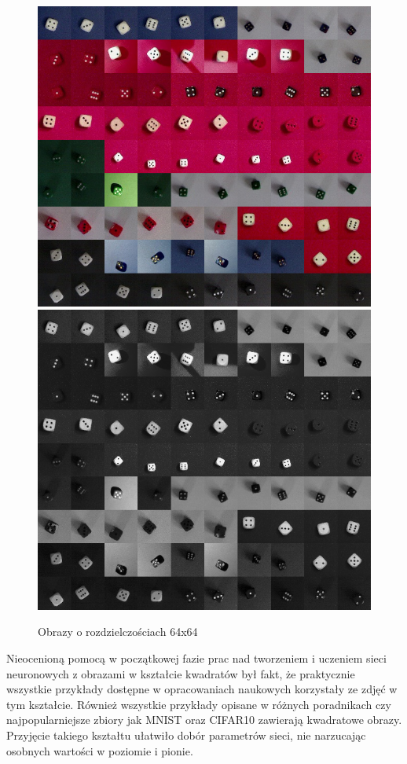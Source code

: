 \begin{figure}[h]
\centering
\includegraphics[scale=0.35]{images/kolaz}
\includegraphics[scale=0.35]{images/kolaz_grayscale}
\caption{Obrazy o rozdzielczościach 64x64}
\end{figure}

Nieocenioną pomocą w początkowej fazie prac nad tworzeniem i uczeniem sieci neuronowych
z obrazami w kształcie kwadratów był fakt, że praktycznie wszystkie przykłady dostępne
w opracowaniach naukowych korzystały ze zdjęć w tym kształcie. Również wszystkie
przykłady opisane w różnych poradnikach czy najpopularniejsze zbiory jak MNIST oraz
CIFAR10 zawierają kwadratowe obrazy. Przyjęcie takiego kształtu ułatwiło dobór parametrów
sieci, nie narzucając osobnych wartości w poziomie i pionie.

